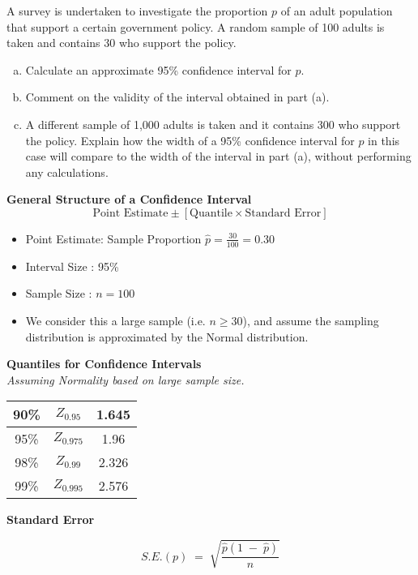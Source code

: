 \documentclass[a4paper,12pt]{article}
\begin{document}
\large
\noindent A survey is undertaken to investigate the proportion $p$ of an adult population that
support a certain government policy. A random sample of 100 adults is taken and
contains 30 who support the policy.
\begin{enumerate}[(a)]
\item  Calculate an approximate 95\% confidence interval for $p$. 
\item  Comment on the validity of the interval obtained in part (a). 
\item A different sample of 1,000 adults is taken and it contains 300 who support the policy.
Explain how the width of a 95\% confidence interval for $p$ in this case will
compare to the width of the interval in part (a), without performing any
calculations.
\end{enumerate}


\begin{framed}
\noindent \textbf{General Structure of a Confidence Interval}
\[  \mbox{Point Estimate} \pm \left[ \mbox{Quantile} \times \mbox{Standard Error}\right]\]
\end{framed}


\begin{itemize}
\item Point Estimate: Sample Proportion ${ \displaystyle \hat{p} = \frac{30}{100} = 0.30 }$
\item Interval Size : 95\%
\item Sample Size : $n=100$
\item We consider this a large sample (i.e. $n \geq 30$), and assume the sampling distribution is approximated by the Normal distribution.
\end{itemize}
\newpage
\noindent \textbf{Quantiles for Confidence Intervals}
\\ \textit{ Assuming Normality based on large sample size.}\\
\begin{center}
\begin{tabular}{|c|c|c|} \hline
90\%     & $Z_{0.95}$ & 1.645 \\ \hline
95\%     & $Z_{0.975}$ & 1.96 \\ \hline
98\%    & $Z_{0.99}$ & 2.326    \\ \hline
99\%    & $Z_{0.995}$ &  2.576  \\ \hline
\end{tabular}
\end{center}
\noindent \textbf{Standard Error}
\begin{framed}
\[ S.E.(p) \;=\; \sqrt{ \frac{\hat{p} (1\;-\;\hat{p})  }{n}  } \]
\end{framed}
\end{document}
